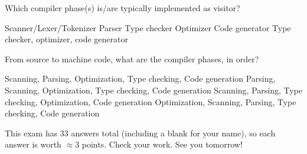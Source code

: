 \documentclass[addpoints]{exam}
\begin{document}
\begin{questions}
\answerline

\question Which compiler phase(s) is/are typically implemented as visitor?

\begin{choices}
\choice Scanner/Lexer/Tokenizer
\choice Parser
\choice Type checker
\choice Optimizer
\choice Code generator
\choice Type checker, optimizer, code generator
\end{choices}

\answerline

\question From source to machine code, what are the compiler phases, in order?

\begin{choices}
\choice Scanning, Parsing, Optimization,  Type checking, Code generation
\choice Parsing, Scanning, Optimization, Type checking, Code generation
\choice Scanning, Parsing, Type checking, Optimization, Code generation
\choice Optimization, Scanning, Parsing, Type checking, Code generation
\end{choices}

\answerline

\end{questions}

This exam has 33 answers total (including a blank for your name), so each answer is worth $\approx 3$ points. Check your work. See you tomorrow!
\end{document}
